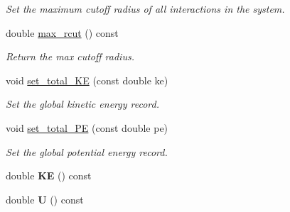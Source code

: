 \begin{DoxyCompactItemize}
\begin{DoxyCompactList}\small\item\em Set the maximum cutoff radius of all interactions in the system. \end{DoxyCompactList}\item 
\hypertarget{classSystem_aebf96e8a2302ab4dd48cee8614f546c1}{double \hyperlink{classSystem_aebf96e8a2302ab4dd48cee8614f546c1}{max\-\_\-rcut} () const }\label{classSystem_aebf96e8a2302ab4dd48cee8614f546c1}

\begin{DoxyCompactList}\small\item\em Return the max cutoff radius. \end{DoxyCompactList}\item 
\hypertarget{classSystem_ad6e5b77a96662d690db44852b80e7638}{void \hyperlink{classSystem_ad6e5b77a96662d690db44852b80e7638}{set\-\_\-total\-\_\-\-K\-E} (const double ke)}\label{classSystem_ad6e5b77a96662d690db44852b80e7638}

\begin{DoxyCompactList}\small\item\em Set the global kinetic energy record. \end{DoxyCompactList}\item 
\hypertarget{classSystem_a2da9018326f13e2ef9b66407234f6a5a}{void \hyperlink{classSystem_a2da9018326f13e2ef9b66407234f6a5a}{set\-\_\-total\-\_\-\-P\-E} (const double pe)}\label{classSystem_a2da9018326f13e2ef9b66407234f6a5a}

\begin{DoxyCompactList}\small\item\em Set the global potential energy record. \end{DoxyCompactList}\item 
\hypertarget{classSystem_aa71800b13f35268a6a288cd5153fe07b}{double {\bfseries K\-E} () const }\label{classSystem_aa71800b13f35268a6a288cd5153fe07b}

\item 
\hypertarget{classSystem_a25faf43e5d30464a88b2ca7fa3d1be59}{double {\bfseries U} () const }\label{classSystem_a25faf43e5d30464a88b2ca7fa3d1be59}

\end{DoxyCompactItemize}

